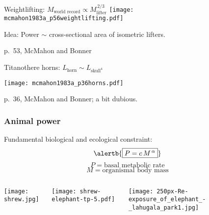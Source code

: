 \begin{frame}

  \begin{block}{Weightlifting: $M_{\textrm{world record}} \propto M_{\textrm{lifter}}^{\, 2/3}$}
    \texttt{[image: mcmahon1983a\_p56weightlifting.pdf]}
    
    Idea: Power $\sim$ cross-sectional area of isometric lifters.
  \end{block}
  
  \small{p.\ 53, McMahon and Bonner\cite{mcmahon1983a}}

\end{frame}

\begin{frame}

  \begin{block}{Titanothere horns: $L_{\textrm{horn}} \sim L_{\textrm{skull}^4}$}
    \begin{center}
      \texttt{[image: mcmahon1983a\_p36horns.pdf]}    
    \end{center}
  \end{block}
  
  \small{p.\ 36, McMahon and Bonner\cite{mcmahon1983a}; a bit dubious.}

\end{frame}



\begin{frame}
  \frametitle{Animal power}

  \begin{block}{Fundamental biological and ecological constraint:}
    $$
    \alertb{\boxed{P = c\, M^{\, \alpha}}}
    $$
    $$P = \mbox{basal metabolic rate}$$
    $$M = \mbox{organismal body mass}$$

    \begin{columns}
      \texttt{[image: shrew.jpg]}
      \begin{overprint}
        \texttt{[image: shrew-elephant-tp-5.pdf]}
      \end{overprint}
      \texttt{[image: 250px-Re-exposure\_of\_elephant\_-\_lahugala\_park1.jpg]}
    \end{columns}
  \end{block}

\end{frame}

